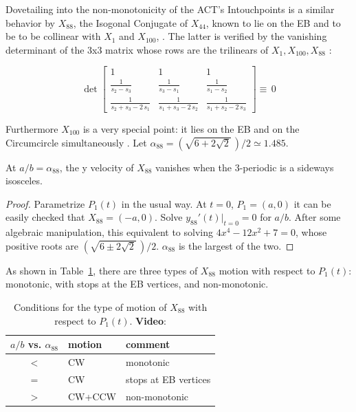 Dovetailing into the non-monotonicity of the ACT's Intouchpoints is a similar behavior by $X_{88}$, the Isogonal Conjugate of $X_{44}$, known to lie on the EB and to be to be collinear with $X_1$ and $X_{100}$, \cite{etc}. The latter is verified by the vanishing determinant of the 3x3 matrix whose rows are the trilinears of $X_1,X_{100},X_{88}$  \cite[under ``Collinear'', eqn 9]{mw}:

\[
\det\left[
\begin {array}{ccc}
1&1&1\\
 \frac{1}{s_2-s_3} & \frac{1}{s_3-s_1} & \frac{1}{s_1-s_2} \\ 
\frac{1}{s_2+s_3-2\,s_1}& \frac{1}{s_1+s_3-2\,s_2} & \frac{1}{s_1+s_2-2\,s_3}
\end{array}
\right]{\equiv}\,0
\]

\smallskip

Furthermore $X_{100}$ is a very special point: it lies on the EB and on the Circumcircle simultaneously \cite{etc}. Let $\alpha_{88}=(\sqrt{6+2\sqrt{2}}\,)/2\simeq{1.485}$.

\begin{proposition}
At $a/b=\alpha_{88}$, the y velocity of $X_{88}$ vanishes when the 3-periodic is a sideways isosceles.
\end{proposition}

\begin{proof}
Parametrize $P_1(t)$ in the usual way. At $t=0$, $P_1=(a,0)$ it can be easily checked that $X_{88}=(-a,0)$. Solve $y_{88}'(t)|_{t=0}=0$ for $a/b$. After some algebraic manipulation, this equivalent to solving $4x^4-12x^2+7=0$, whose positive roots are $(\sqrt{6\pm 2\sqrt{2}}\,)/2$. $\alpha_{88} $ is the largest of the two.
\end{proof}

As shown in Table~\ref{tab:x88}, there are three types of $X_{88}$ motion with respect to $P_1(t)$: monotonic, with stops at the EB vertices, and non-monotonic.


\begin{table}
\begin{center}
\small
\begin{tabular}{|c|l|l|}
\hline
$a/b$ vs. $\alpha_{88}$ & motion & comment \\
\hline
$<$ & CW & monotonic\\
$=$ & CW & stops at EB vertices \\
$>$ & CW+CCW & non-monotonic \\
\hline
\end{tabular}
\caption{Conditions for the type of motion of $X_{88}$ with respect to $P_1(t)$. \textbf{Video}: \cite[PL\#11]{reznik2020-playlist-intriguing}}
\label{tab:x88}
\end{center}
\end{table}


